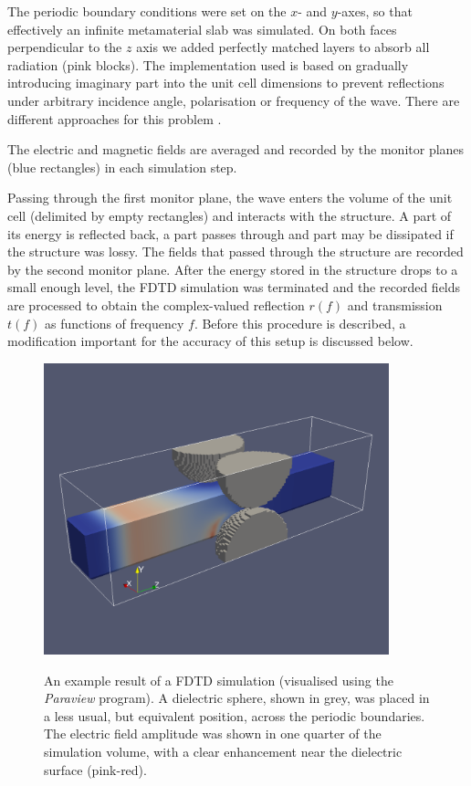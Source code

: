 The periodic boundary conditions were set on the $x$- and $y$-axes, so that effectively an infinite metamaterial slab was simulated. On both faces perpendicular to the $z$ axis we added perfectly matched layers to absorb all radiation (pink blocks). The implementation used is based on gradually introducing imaginary part into the unit cell dimensions  to prevent reflections under arbitrary incidence angle, polarisation or frequency of the wave. There are different approaches for this problem \cite{oskooi2011distinguishing}. %

The electric and magnetic fields are averaged and recorded by the monitor planes (blue rectangles) in each simulation step.  

Passing through the first monitor plane, the wave enters the volume of the unit cell (delimited by empty rectangles) and interacts with the structure. A part of its energy is reflected back, a part passes through and part may be dissipated if the structure was lossy. The fields that passed through the structure are recorded by the second monitor plane. After the energy stored in the structure drops to a small enough level, the FDTD simulation was terminated and the recorded fields are processed to obtain the complex-valued reflection $r(f)$ and transmission $t(f)$ as functions of frequency $f$. Before this procedure is described, a modification important for the accuracy of this setup is discussed below.

\begin{figure}[ht] \caption{An example result of a FDTD simulation (visualised using the \textit{Paraview} program). A dielectric sphere, shown in grey, was placed in a less usual, but equivalent position, across the periodic boundaries. The electric field amplitude was shown in one quarter of the simulation volume, with a clear enhancement near the dielectric surface (pink-red). }  \centering \includegraphics[width=10cm]{img/sim_screen.pdf} \label{fg_fdtdscreen} \end{figure} 
